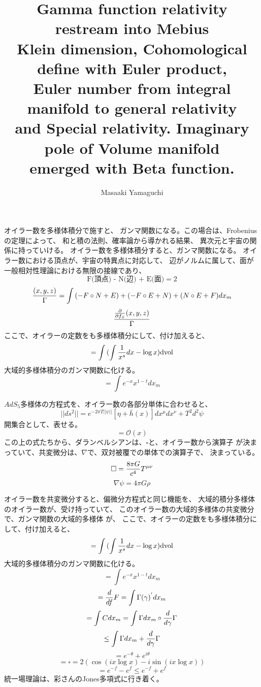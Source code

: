 \documentclass{jsarticle}
\begin{document}
\title{Gamma function relativity restream into Mebius \\
Klein dimension, Cohomological define with Euler product, \\
Euler number from integral manifold to general relativity \\
and Special relativity. Imaginary pole of Volume manifold \\
emerged with Beta function.}
\author{Masaaki Yamaguchi}
\date{}
\maketitle

        オイラー数を多様体積分で施すと、
   ガンマ関数になる。この場合は、Frobeniusの定理によって、
   和と積の法則、確率論から導かれる結果、
   異次元と宇宙の関係に持っていける。
   オイラー数を多様体積分すると、ガンマ関数になる。
   オイラー数における頂点が、宇宙の特異点に対応して、
   辺がノルムに属して、面が一般相対性理論における無限の接線であり、
   $$ \text{F(頂点) - N(辺) + E(面)} = 2 $$
   $$ {(x,y,z) \over \Gamma} = \int{(- F\circ N + E)} + 
   (-F\circ E + N) + (N\circ E + F)dx_m $$
   $$ {{{\partial \over \partial f_S}(x,y,z)} \over {\Gamma}} $$
   ここで、オイラーの定数をも多様体積分にして、付け加えると、
   $$ = \int{({\int {1 \over x^s}dx} - \log x)}\mathrm{dvol} $$
   大域的多様体積分のガンマ関数に化ける。
   $$ = \int e^{-x}x^{1 - t}dx_m $$

   $AdS_5$多様体の方程式を、オイラー数の各部分単体に合わせると、
   $$ ||ds^2|| = e^{-2\pi T||\psi||}[\eta + \bar{h}(x)]dx^{\mu}dx^{\nu} 
   + T^2d^2 \psi $$
   開集合として、表せる。
   $$ = \mathcal{O}(x) $$
   この上の式たちから、ダランベルシアンは、$\square$と、オイラー数から演算子
   が決まっていて、共変微分は、$\nabla$で、双対被覆での単体での演算子で、
   決まっている。
   $$ \square = {{8 \pi G} \over c^4} T^{\mu\nu} $$
   $$ \nabla \psi = 4 \pi G \rho $$

   オイラー数を共変微分すると、偏微分方程式と同じ機能を、
   大域的積分多様体のオイラー数が、受け持っていて、
   このオイラー数の大域的多様体の共変微分で、ガンマ関数の大域的多様体
   が、
   ここで、オイラーの定数をも多様体積分にして、付け加えると、
   $$ = \int{({\int {1 \over x^s}dx} - \log x)}\mathrm{dvol} $$
   大域的多様体積分のガンマ関数に化ける。
   $$ = \int e^{-x}x^{1 - t}dx_m $$
   $$ = {d \over d f}F = \int \Gamma(\gamma)^{'}dx_m $$
   $$ = \int C dx_m = \int \Gamma dx_m \circ {d \over d \gamma}\Gamma $$
   $$ \le \int \Gamma dx_m + {d \over d \gamma}\Gamma $$
   $$ = e^{- \theta} + e^{i \theta} $$
   $$ = \square = 2(\cos (i x \log x) - i \sin (i x \log x))$$
   $$ = e^{-f} - e^{f} \le e^{-f} + e^{f} $$
   統一場理論は、彩さんのJones多項式に行き着く。
\end{document}
